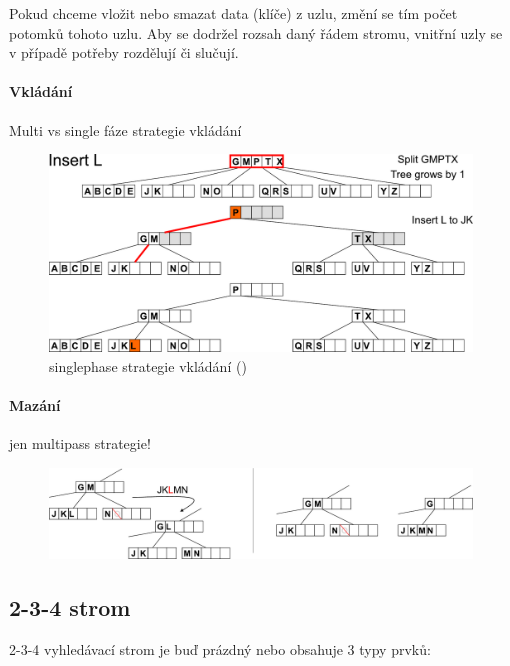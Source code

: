 Pokud chceme vložit nebo smazat data (klíče) z uzlu, změní se tím počet potomků tohoto uzlu. Aby se dodržel rozsah daný řádem stromu, vnitřní uzly se v případě potřeby rozdělují či slučují.

\paragraph{Vkládání} Multi vs single fáze strategie vkládání

\begin{figure}[h]
    \begin{center}
        \includegraphics[width=130mm]{03/images/btree-insert}
    \end{center}
    \caption{singlephase strategie vkládání ()}
\end{figure}

\paragraph{Mazání} jen multipass strategie!

\begin{figure}[h]
    \begin{center}
        \includegraphics[width=140mm]{03/images/btree-delete}
    \end{center}
\end{figure}

\subsection{2-3-4 strom}
2-3-4 vyhledávací strom je buď prázdný nebo obsahuje 3 typy prvků:

